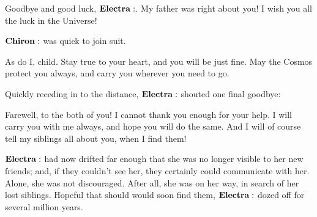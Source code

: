 \documentclass[main.tex]{subfiles}
\begin{document}
\Hippe Goodbye and good luck, $\Electra$.  My father was right about you!  I wish you all the luck in the Universe!

$\Chiron$ was quick to join suit.

\Chiron As do I, child.  Stay true to your heart, and you will be just fine.  May the Cosmos protect you always, and carry you wherever you need to go.

Quickly receding in to the distance, $\Electra$ shouted one final goodbye:

\Electra Farewell, to the both of you!  I cannot thank you enough for your help.  I will carry you with me always, and hope you will do the same.  And I will of course tell my siblings all about you, when I find them!

$\Electra$ had now drifted far enough that she was no longer visible to her new friends; and, if they couldn't see her, they certainly could communicate with her.  Alone, she was not discouraged.  After all, she was on her way, in search of her lost siblings.  Hopeful that should would soon find them, $\Electra$ dozed off for several million years.


\end{document}

